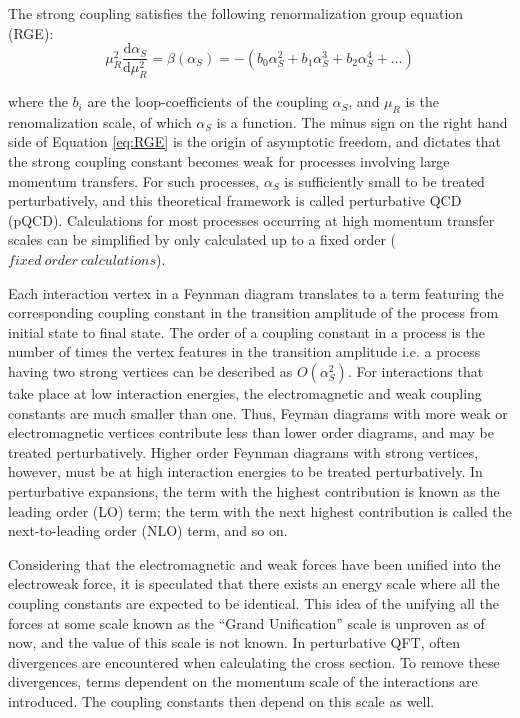 \documentclass[12pt,a4paper,openright,twoside]{report}
\newcommand{\myequations}[1]{%
\addcontentsline{equ}{myequations}{\protect\numberline{\theequation}#1}\par}
\begin{document}
The strong coupling satisfies the following renormalization group equation (RGE):
\begin{equation}\label{eq:RGE}
\mu_R^2\frac{\mathrm{d}\alpha_S}{\mathrm{d}\mu_R^2} = \beta(\alpha_S) = -(b_0\alpha_S^2 + b_1\alpha_S^3 + b_2\alpha_S^4 + ...)
\end{equation}
\myequations{Renormalization Group Equation}
where the $b_i$ are the loop-coefficients of the coupling $\alpha_S$, and $\mu_R$ is the renomalization scale, of which $\alpha_S$ is a function. The minus sign on the right hand side of Equation \ref{eq:RGE} is the origin of asymptotic freedom, and dictates that the strong coupling constant becomes weak for processes involving large momentum transfers. For such processes, $\alpha_S$ is sufficiently small to be treated perturbatively, and this theoretical framework is called perturbative QCD (pQCD). Calculations for most processes occurring at high momentum transfer scales can be simplified by only calculated up to a fixed order ($fixed\ order\ calculations$).

Each interaction vertex in a Feynman diagram translates to a term featuring the corresponding coupling constant in the transition amplitude of the process from initial state to final state. The order of a coupling constant in a process is the number of times the vertex features in the transition amplitude i.e. a process having two strong vertices can be described as $O(\alpha_{S}^2)$. For interactions that take place at low interaction energies, the electromagnetic and weak coupling constants are much smaller than one. Thus, Feyman diagrams with more weak or electromagnetic vertices contribute less than lower order diagrams, and may be treated perturbatively. Higher order Feynman diagrams with strong vertices, however, must be at high interaction energies to be treated perturbatively. In perturbative expansions, the term with the highest contribution is known as the leading order (LO) term; the term with the next highest contribution is called the next-to-leading order (NLO) term, and so on.

Considering that the electromagnetic and weak forces have been unified into the electroweak force, it is speculated that there exists an energy scale where all the coupling constants are expected to be identical. This idea of the unifying all the forces at some scale known as the ``Grand Unification'' scale is unproven as of now, and the value of this scale is not known. In perturbative QFT, often divergences are encountered when calculating the cross section. To remove these divergences, terms dependent on the momentum scale of the interactions are introduced. The coupling constants then depend on this scale as well.
\end{document}
